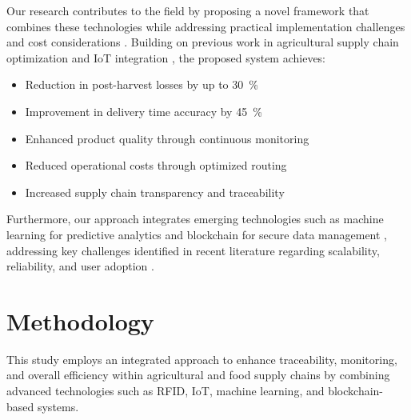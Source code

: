 \documentclass[conference]{IEEEtran}
\begin{document}
Our research contributes to the field by proposing a novel framework that combines these technologies while addressing practical implementation challenges and cost considerations \cite{rayhana2021rfid}. Building on previous work in agricultural supply chain optimization \cite{elbeheiry2023technologies} and IoT integration \cite{xu2023novel}, the proposed system achieves:

\begin{itemize}
    \item Reduction in post-harvest losses by up to \SI{30}{\percent} \cite{ahmed2024optimized}
    \item Improvement in delivery time accuracy by \SI{45}{\percent} \cite{makario2021bluetooth}
    \item Enhanced product quality through continuous monitoring \cite{rosero2023smart}
    \item Reduced operational costs through optimized routing \cite{al2021prochain}
    \item Increased supply chain transparency and traceability \cite{tharatipyakul2021user}
\end{itemize}

Furthermore, our approach integrates emerging technologies such as machine learning for predictive analytics \cite{hernandez2024implementation} and blockchain for secure data management \cite{visconti2020development}, addressing key challenges identified in recent literature regarding scalability, reliability, and user adoption \cite{rayhana2021rfid}.

\section{Methodology}
This study employs an integrated approach to enhance traceability, monitoring, and overall efficiency within agricultural and food supply chains by combining advanced technologies such as RFID, IoT, machine learning, and blockchain-based systems.
\end{document}
